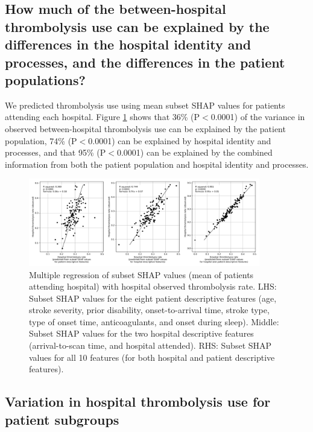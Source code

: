 \subsection{How much of the between-hospital thrombolysis use can be explained by the differences in the hospital identity and processes, and the differences in the patient populations?}

We predicted thrombolysis use using mean subset SHAP values for patients attending each hospital. Figure \ref{fig:shap_multiple_regression} shows that 36\% (P$<$0.0001) of the variance in observed between-hospital thrombolysis use can be explained by the patient population, 74\% (P$<$0.0001) can be explained by hospital identity and processes, and that 95\% (P$<$0.0001) can be explained by the combined information from both the patient population and hospital identity and processes. 

\begin{figure}[!h]
    \centering
    \includegraphics[width=0.9\textwidth]{./images/03f_xgb_10_features_multiple_regression_patient_hospital}
    \caption{Multiple regression of subset SHAP values (mean of patients attending hospital) with hospital observed thrombolysis rate. LHS: Subset SHAP values for the eight patient descriptive features (age, stroke severity, prior disability, onset-to-arrival time, stroke type, type of onset time, anticoagulants, and onset during sleep). Middle: Subset SHAP values for the two hospital descriptive features (arrival-to-scan time, and hospital attended). RHS: Subset SHAP values for all 10 features (for both hospital and patient descriptive features).}
  \label{fig:shap_multiple_regression}
\end{figure}

\subsection{Variation in hospital thrombolysis use for patient subgroups}

